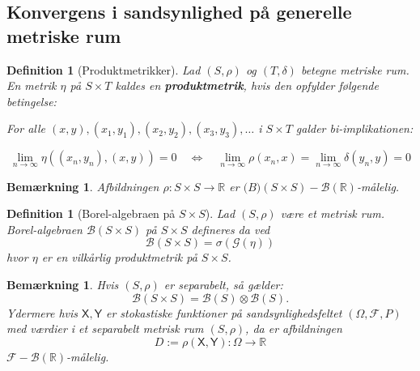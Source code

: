 \documentclass{article}
\newcommand{\R}{\mathbb{R}}
\newcommand{\1}{\mathbbm{1}}
\newcommand{\X}{\mathsf{X}}
\newcommand{\Y}{\mathsf{Y}}
\newcommand{\pfield}{(\Omega, \mathcal{F}, P)}
\newtheorem{definition}[theorem]{Definition}
\newtheorem{remark}[theorem]{Bemærkning}
\theoremstyle{boxed}
\begin{document}
\subsection{Konvergens i sandsynlighed på generelle metriske rum}
\begin{theorem-box}
    \begin{definition}[Produktmetrikker]
        Lad $(S, \rho)$ og $(T, \delta)$ betegne metriske rum.
En metrik $\eta$ på $S \times T$ kaldes en \textbf{produktmetrik}, hvis den opfylder følgende betingelse:

For alle $(x, y),\left(x_1, y_1\right),\left(x_2, y_2\right),\left(x_3, y_3\right), \ldots$ i $S \times T$ galder bi-implikationen:

$$
\lim _{n \rightarrow \infty} \eta\left(\left(x_n, y_n\right),(x, y)\right)=0 \quad\Longleftrightarrow \quad\lim _{n \rightarrow \infty} \rho\left(x_n, x\right)=\lim _{n \rightarrow \infty} \delta\left(y_n, y\right)=0
$$

    \end{definition}
\end{theorem-box}
\begin{remark}
    Afbildningen $\rho:S\times S\rightarrow\R$ er $\mathcal(B)(S\times S)-\mathcal{B}(\R)$-målelig.
\end{remark}
\begin{theorem-box}
    \begin{definition}[Borel-algebraen på $S\times S$]
        Lad $(S, \rho)$ være et metrisk rum.
Borel-algebraen $\mathcal{B}(S \times S)$ på $S \times S$ defineres da ved
$$
\mathcal{B}(S \times S)=\sigma(\mathcal{G}(\eta))
$$
hvor $\eta$ er en vilkårlig produktmetrik på $S \times S$.
    \end{definition}
\end{theorem-box}
\begin{remark}
    Hvis $(S,\rho)$ er separabelt, så gælder: $$\mathcal{B}(S\times S)=\mathcal{B}(S)\otimes\mathcal{B}(S).$$ Ydermere hvis $\X,\Y$ er stokastiske funktioner på sandsynlighedsfeltet $\pfield$ med værdier i et separabelt metrisk rum $(S,\rho)$, da er afbildningen $$D:=\rho(\X,\Y):\Omega\rightarrow \R$$ $\mathcal{F}-\mathcal{B}(\R)$-målelig.
\end{remark}
\end{document}
